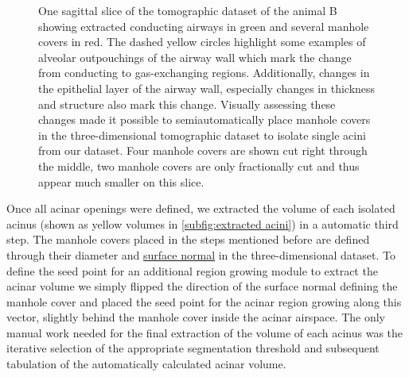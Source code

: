 \documentclass[%
	draft,
	paper=a4,%
	abstract=true,%
	]{scrartcl}
\newlength\imagescale		%
\begin{document}
\begin{figure}
%
	\caption{One sagittal slice of the tomographic dataset of the animal B showing extracted conducting airways in green and several manhole covers in red. The dashed yellow circles highlight some examples of alveolar outpouchings of the airway wall which mark the change from conducting to gas-exchanging regions. Additionally, changes in the epithelial layer of the airway wall, especially changes in thickness and structure also mark this change. Visually assessing these changes made it possible to semiautomatically place manhole covers in the three-dimensional tomographic dataset to isolate single acini from our dataset. Four manhole covers are shown cut right through the middle, two manhole covers are only fractionally cut and thus appear much smaller on this slice.}
	\label{fig:ManholeCoverExplanation}
\end{figure}

Once all acinar openings were defined, we extracted the volume of each isolated acinus (shown as yellow volumes in \autoref{subfig:extracted acini}) in a automatic third step. The manhole covers placed in the steps mentioned before are defined through their diameter and \href{https://secure.wikimedia.org/wikipedia/en/w/index.php?title=Surface_normal&oldid=411684319}{surface normal} in the three-dimensional dataset. To define the seed point for an additional region growing module to extract the acinar volume we simply flipped the direction of the surface normal defining the manhole cover and placed the seed point for the acinar region growing along this vector, slightly behind the manhole cover inside the acinar airspace. The only manual work needed for the final extraction of the volume of each acinus was the iterative selection of the appropriate segmentation threshold and subsequent tabulation of the automatically calculated acinar volume.
\end{document}

